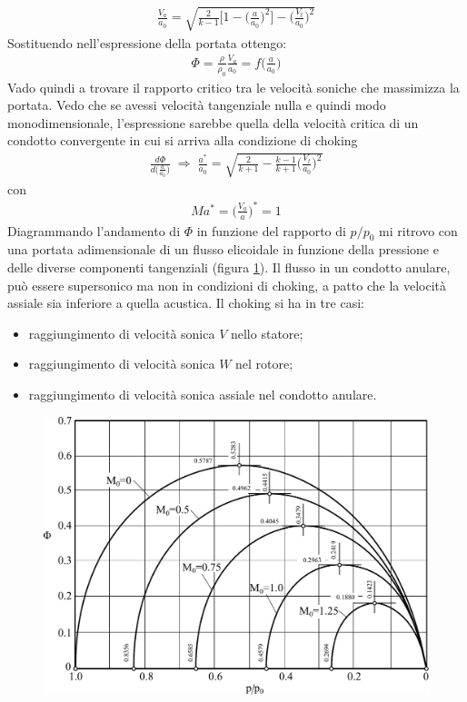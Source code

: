 \begin{align*}
\frac{V_a}{a_0} = \sqrt{\frac{2}{k-1} \bigg[ 1- \bigg( \frac{a}{a_0} \bigg)^2 \bigg] - \bigg( \frac{V_t}{a_0} \bigg)^2}
\end{align*}
Sostituendo nell'espressione della portata ottengo:
\begin{align*}
\Phi = \frac{\rho}{\rho_0} \frac{V_a}{a_0} = f \bigg( \frac{a}{a_0} \bigg)
\end{align*}
Vado quindi a trovare il rapporto critico tra le velocità soniche che massimizza la portata. Vedo che se avessi velocità tangenziale nulla e quindi modo monodimensionale, l'espressione sarebbe quella della velocità critica di un condotto convergente in cui si arriva alla condizione di choking
\begin{align*}
\frac{d\Phi}{d \bigg( \frac{a}{a_0} \bigg)} \; \Rightarrow \; \boxed{ \frac{a^*}{a_0} = \sqrt{\frac{2}{k+1} - \frac{k-1}{k+1} \bigg( \frac{V_t}{a_0} \bigg)^2} }
\end{align*}
con
\begin{align*}
Ma^* = \bigg( \frac{V_a}{a} \bigg)^* = 1
\end{align*}
Diagrammando l'andamento di $\Phi$ in funzione del rapporto di $p/p_0$ mi ritrovo con una portata adimensionale di un flusso elicoidale in funzione della pressione e delle diverse componenti tangenziali (figura \ref{fd:PortCondAn}). Il flusso in un condotto anulare, può essere supersonico ma non in condizioni di choking, a patto che la velocità assiale sia inferiore a quella acustica. Il choking si ha in tre casi:
\begin{itemize}
\item raggiungimento di velocità sonica $V$ nello statore;
\item raggiungimento di velocità sonica $W$ nel rotore;
\item raggiungimento di velocità sonica assiale nel condotto anulare.
\end{itemize}
\begin{figure}
\centering
  \includegraphics[width=.7\textwidth]{fig/PortCondAn.pdf}
\caption{}
\label{fd:PortCondAn}
\end{figure}

